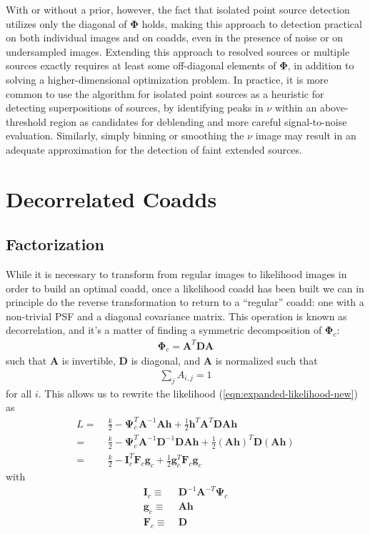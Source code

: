 \documentclass[10pt]{article}
\newcommand{\eqnref}[1]{(\ref{eqn:#1})}
\begin{document}
With or without a prior, however, the fact that isolated point source detection utilizes only the diagonal of $\bm{\Phi}$ holds, making this approach to detection practical on both individual images and on coadds, even in the presence of noise or on undersampled images.  Extending this approach to resolved sources or multiple sources exactly requires at least some off-diagonal elements of $\bm{\Phi}$, in addition to solving a higher-dimensional optimization problem.  In practice, it is more common to use the algorithm for isolated point sources as a heuristic for detecting superpositions of sources, by identifying peaks in $\nu$ within an above-threshold region as candidates for deblending and more careful signal-to-noise evaluation.  Similarly, simply binning or smoothing the $\nu$ image may result in an adequate approximation for the detection of faint extended sources.


\section{Decorrelated Coadds}
\label{sec:decorrelated-coadds}

\subsection{Factorization}
\label{sec:factorization}

While it is necessary to transform from regular images to likelihood images in order to build an optimal coadd, once a likelihood coadd has been built we can in principle do the reverse transformation to return to a ``regular'' coadd: one with a non-trivial PSF and a diagonal covariance matrix.  This operation is known as decorrelation, and it's a matter of finding a symmetric decomposition of $\bm{\Phi}_c$:
\begin{align}
\bm{\Phi}_c = \bm{A}^T \bm{D} \bm{A}
\label{eqn:decorrelate-factorization}
\end{align}
such that $\bm{A}$ is invertible, $\bm{D}$ is diagonal, and $\bm{A}$ is normalized such that
\begin{align}
\sum_j A_{i,j} = 1
\end{align}
for all $i$.  This allows us to rewrite the likelihood \eqnref{expanded-likelihood-new} as
\begin{align}
L
=\;& \frac{k}{2} - \bm{\Psi}_c^T\!\bm{A}^{-1}\!\bm{A}\bm{h}
    + \frac{1}{2}\bm{h}^T\!\bm{A}^T\!\bm{D}\bm{A}\bm{h}\\
=\;& \frac{k}{2} - \bm{\Psi}_c^T\!\bm{A}^{-1}\bm{D}^{-1}\!\bm{D}\bm{A}\bm{h}
    + \frac{1}{2}\left(\bm{A}\bm{h}\right)^T\!\bm{D}\left(\bm{A}\bm{h}\right)
    \\
=\;& \frac{k}{2} - \bm{I}_c^T\!\bm{F}_c\bm{g}_c
    + \frac{1}{2}\bm{g}_c^T\!\bm{F}_c\bm{g}_c
\label{eqn:likelihood-decorrelated}
\end{align}
with
\begin{align}
\bm{I}_c \equiv\;& \bm{D}^{-1}\bm{A}^{-T}\bm{\Psi}_c \\
\bm{g}_c \equiv\;& \bm{A}\bm{h} \\
\bm{F}_c \equiv\;& \bm{D}
\end{align}
\end{document}
